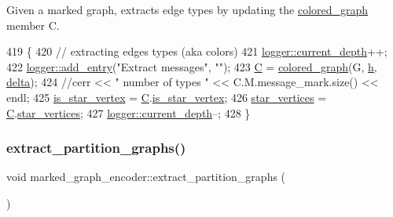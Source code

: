 Given a marked graph, extracts edge types by updating the \hyperlink{classcolored__graph}{colored\+\_\+graph} member C. 


\begin{DoxyCode}
419 \{
420   \textcolor{comment}{// extracting edges types (aka colors)}
421   \hyperlink{classlogger_a9d29b49bd318a719a8e85b59eac54fe0}{logger::current\_depth}++;
422   \hyperlink{classlogger_a710163deb17bc81f70d53d285b8ac9ac}{logger::add\_entry}(\textcolor{stringliteral}{"Extract messages"}, \textcolor{stringliteral}{""});
423   \hyperlink{classmarked__graph__encoder_af82bc0653414091291cb75553a407bdb}{C} = \hyperlink{classcolored__graph}{colored\_graph}(G, \hyperlink{classmarked__graph__encoder_ae7f8872c57d2d64e4ca6cc47387b9b58}{h}, \hyperlink{classmarked__graph__encoder_a29dcf42526b12cf7964a556bb1025c9b}{delta});
424   \textcolor{comment}{//cerr << " number of types " << C.M.message\_mark.size() << endl;}
425   \hyperlink{classmarked__graph__encoder_ac36f6c2430af6fa4d20584569859bb59}{is\_star\_vertex} = \hyperlink{classmarked__graph__encoder_af82bc0653414091291cb75553a407bdb}{C}.\hyperlink{classcolored__graph_ad41163e970530c7e45878d299f0dc961}{is\_star\_vertex};
426   \hyperlink{classmarked__graph__encoder_a08fdf6fcd7dcd8c5d1667f2d7ff06c2c}{star\_vertices} = \hyperlink{classmarked__graph__encoder_af82bc0653414091291cb75553a407bdb}{C}.\hyperlink{classcolored__graph_ab7ee8d717abde7ad7467ef695038f574}{star\_vertices};
427   \hyperlink{classlogger_a9d29b49bd318a719a8e85b59eac54fe0}{logger::current\_depth}--;
428 \}
\end{DoxyCode}
\mbox{\label{classmarked__graph__encoder_a60b0038c57bd8fa2f5cb3f0b6999c4f3}} 
\subsubsection{\texorpdfstring{extract\+\_\+partition\+\_\+graphs()}{extract\_partition\_graphs()}}
{\footnotesize\ttfamily void marked\+\_\+graph\+\_\+encoder\+::extract\+\_\+partition\+\_\+graphs (\begin{DoxyParamCaption}{ }\end{DoxyParamCaption})\hspace{0.3cm}{\ttfamily [private]}}



